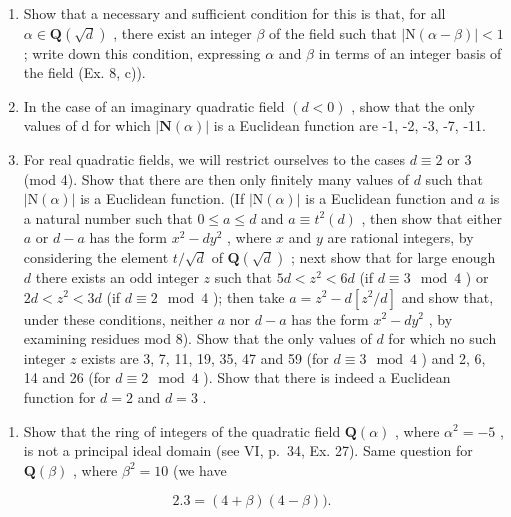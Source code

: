 \begin{enumerate}
\def\labelenumi{\alph{enumi})}
\item
  Show that a necessary and sufficient condition for this is that, for all \(\alpha \in \mathbf{Q}(\sqrt{d})\) , there exist an integer \(\beta\) of the field such that \(|\mathrm{N}(\alpha - \beta)| < 1\) ; write down this condition, expressing \(\alpha\) and \(\beta\) in terms of an integer basis of the field (Ex. 8, c)).
\item
  In the case of an imaginary quadratic field \((d < 0)\) , show that the only values of d for which \(|\mathbf{N}(\alpha)|\) is a Euclidean function are -1, -2, -3, -7, -11.
\item
  For real quadratic fields, we will restrict ourselves to the cases \(d \equiv 2\) or 3 (mod 4). Show that there are then only finitely many values of \(d\) such that \(|\mathrm{N}(\alpha)|\) is a Euclidean function. (If \(|\mathrm{N}(\alpha)|\) is a Euclidean function and \(a\) is a natural number such that \(0 \leqslant a \leqslant d\) and \(a \equiv t^2(d)\) , then show that either \(a\) or \(d - a\) has the form \(x^2 - dy^2\) , where \(x\) and \(y\) are rational integers, by considering the element \(t / \sqrt{d}\) of \(\mathbf{Q}(\sqrt{d})\) ; next show that for large enough \(d\) there exists an odd integer \(z\) such that \(5d < z^2 < 6d\) (if \(d \equiv 3 \mod 4\) ) or \(2d < z^2 < 3d\) (if \(d \equiv 2 \mod 4\) ); then take \(a = z^2 - d[z^2/d]\) and show that, under these conditions, neither \(a\) nor \(d - a\) has the form \(x^2 - dy^2\) , by examining residues mod 8). Show that the only values of \(d\) for which no such integer \(z\) exists are 3, 7, 11, 19, 35, 47 and 59 (for \(d \equiv 3 \mod 4\) ) and 2, 6, 14 and 26 (for \(d \equiv 2 \mod 4\) ). Show that there is indeed a Euclidean function for \(d = 2\) and \(d = 3\) .
\end{enumerate}

\begin{enumerate}
\def\labelenumi{\arabic{enumi})}
\setcounter{enumi}{11}
\tightlist
\item
  Show that the ring of integers of the quadratic field \(\mathbf{Q}(\alpha)\) , where \(\alpha^2 = -5\) , is not a principal ideal domain (see VI, p.~34, Ex. 27). Same question for \(\mathbf{Q}(\beta)\) , where \(\beta^2 = 10\) (we have
\end{enumerate}

\[
2. 3 = (4 + \beta) (4 - \beta)).
\]

